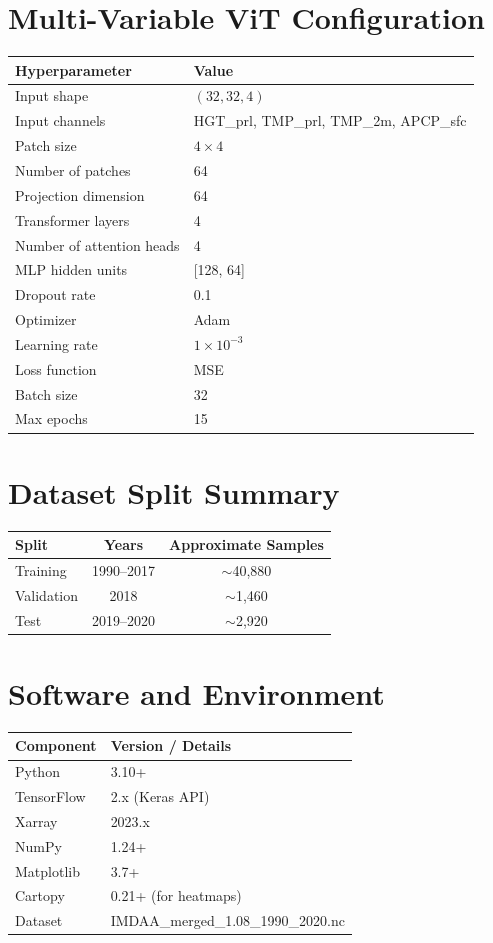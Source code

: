 \documentclass[12pt,a4paper,oneside]{report}
\begin{document}
\section{Multi-Variable ViT Configuration}
\begin{tabular}{ll}
\toprule
\textbf{Hyperparameter} & \textbf{Value} \\
\midrule
Input shape & $(32, 32, 4)$ \\
Input channels & HGT\_prl, TMP\_prl, TMP\_2m, APCP\_sfc \\
Patch size & $4 \times 4$ \\
Number of patches & 64 \\
Projection dimension & 64 \\
Transformer layers & 4 \\
Number of attention heads & 4 \\
MLP hidden units & [128, 64] \\
Dropout rate & 0.1 \\
Optimizer & Adam \\
Learning rate & $1 \times 10^{-3}$ \\
Loss function & MSE \\
Batch size & 32 \\
Max epochs & 15 \\
\bottomrule
\end{tabular}

\section{Dataset Split Summary}
\begin{tabular}{lcc}
\toprule
\textbf{Split} & \textbf{Years} & \textbf{Approximate Samples} \\
\midrule
Training   & 1990--2017 & $\sim$40,880 \\
Validation & 2018       & $\sim$1,460  \\
Test       & 2019--2020 & $\sim$2,920  \\
\bottomrule
\end{tabular}

\section{Software and Environment}
\begin{tabular}{ll}
\toprule
\textbf{Component} & \textbf{Version / Details} \\
\midrule
Python      & 3.10+ \\
TensorFlow  & 2.x (Keras API) \\
Xarray      & 2023.x \\
NumPy       & 1.24+ \\
Matplotlib  & 3.7+ \\
Cartopy     & 0.21+ (for heatmaps) \\
Dataset     & IMDAA\_merged\_1.08\_1990\_2020.nc \\
\bottomrule
\end{tabular}
\end{document}
